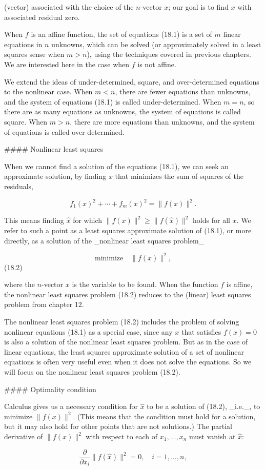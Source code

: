 (vector) associated with the choice of the \(n\)-vector \(x\); our goal is to find \(x\) with associated residual zero.

When \(f\) is an affine function, the set of equations (18.1) is a set of \(m\) linear equations in \(n\) unknowns, which can be solved (or approximately solved in a least squares sense when \(m>n\)), using the techniques covered in previous chapters. We are interested here in the case when \(f\) is not affine.

We extend the ideas of under-determined, square, and over-determined equations to the nonlinear case. When \(m<n\), there are fewer equations than unknowns, and the system of equations (18.1) is called under-determined. When \(m=n\), so there are as many equations as unknowns, the system of equations is called square. When \(m>n\), there are more equations than unknowns, and the system of equations is called over-determined.

#### Nonlinear least squares

When we cannot find a solution of the equations (18.1), we can seek an approximate solution, by finding \(x\) that minimizes the sum of squares of the residuals,

\[f_{1}(x)^{2}+\cdots+f_{m}(x)^{2}=\|f(x)\|^{2}.\]

This means finding \(\hat{x}\) for which \(\|f(x)\|^{2}\geq\|f(\hat{x})\|^{2}\) holds for all \(x\). We refer to such a point as a least squares approximate solution of (18.1), or more directly, as a solution of the _nonlinear least squares problem_

\[\text{minimize}\quad\|f(x)\|^{2},\] (18.2)

where the \(n\)-vector \(x\) is the variable to be found. When the function \(f\) is affine, the nonlinear least squares problem (18.2) reduces to the (linear) least squares problem from chapter 12.

The nonlinear least squares problem (18.2) includes the problem of solving nonlinear equations (18.1) as a special case, since any \(x\) that satisfies \(f(x)=0\) is also a solution of the nonlinear least squares problem. But as in the case of linear equations, the least squares approximate solution of a set of nonlinear equations is often very useful even when it does not solve the equations. So we will focus on the nonlinear least squares problem (18.2).

#### Optimality condition

Calculus gives us a necessary condition for \(\hat{x}\) to be a solution of (18.2), _i.e._, to minimize \(\|f(x)\|^{2}\). (This means that the condition must hold for a solution, but it may also hold for other points that are not solutions.) The partial derivative of \(\|f(x)\|^{2}\) with respect to each of \(x_{1},\ldots,x_{n}\) must vanish at \(\hat{x}\):

\[\frac{\partial}{\partial x_{i}}\|f(\hat{x})\|^{2}=0,\quad i=1,\ldots,n,\] 